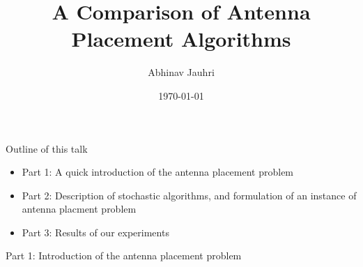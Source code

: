 \documentclass{beamer}
\title{\color{univred} A Comparison of Antenna Placement Algorithms}
\author{Abhinav Jauhri}
\date{\today}
\begin{document}
    \begin{frame}
        \color{univred}
        \titlepage
    \end{frame}

    \begin{frame}{Outline of this talk}
        \begin{itemize}
            \setlength\itemsep{2em}
            \item Part 1: A quick introduction of the antenna placement problem
            \item Part 2: Description of stochastic algorithms, and formulation of an instance of antenna placment problem
            \item Part 3: Results of our experiments
        \end{itemize}
    \end{frame}

    \begin{frame}{\null}
        \begin{tcolorbox}[colback=green!5]
            \centering\Huge
            Part 1: Introduction of the antenna placement problem
            \end{tcolorbox}
    \end{frame}
\end{document}
